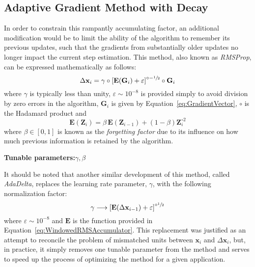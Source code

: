 \documentclass{article}
\begin{document}
\subsection{Adaptive Gradient Method with Decay}
\label{subsec:AdaDecay}

In order to constrain this rampantly accumulating factor, an additional modification would be to limit the ability of the algorithm to remember its previous updates, such that the gradients from substantially older updates no longer impact the current step estimation. This method, also known as \emph{RMSProp}, can be expressed mathematically as follows:
\begin{equation}
\label{eq:SE_RMSProp}
	\Delta \mathbf{x}_i = \gamma \circ \left[\mathbf{E}\!\left(\mathbf{G}_i\right) + \varepsilon\right]^{ \circ-\sfrac{1}{2}} \circ \mathbf{G}_i
\end{equation}
where $\gamma$ is typically less than unity, $\varepsilon \sim 10^{-8}$ is provided simply to avoid division by zero errors in the algorithm, $\mathbf{G}_i$ is given by Equation~\eqref{eq:GradientVector}, $\circ$ is the Hadamard product and
\begin{equation}
\label{eq:WindowedRMSAccumulator}
	\mathbf{E}\!\left(\mathbf{Z}_i\right) = \beta \, \mathbf{E}\!\left(\mathbf{Z}_{i-1}\right) + \left(1 - \beta\right) \mathbf{Z}_i^{\circ 2}
\end{equation}
where $\beta \in \left[0,1\right]$ is known as the \emph{forgetting factor} due to its influence on how much previous information is retained by the algorithm.

\begin{center}
	\textbf{Tunable parameters:}\hspace{20pt}$\gamma,\beta$
\end{center}

It should be noted that another similar development of this method, called \emph{AdaDelta}, replaces the learning rate parameter, $\gamma$, with the following normalization factor:
\begin{equation}
\label{eq:AdaDelta_RateReplacement}
	\gamma \longrightarrow \left[\mathbf{E}\!\left(\Delta \mathbf{x}_{i-1}\right) + \varepsilon\right]^{\circ\sfrac{1}{2}}
\end{equation}
where $\varepsilon \sim 10^{-8}$ and $\mathbf{E}$ is the function provided in Equation~\eqref{eq:WindowedRMSAccumulator}. This replacement was justified as an attempt to reconcile the problem of mismatched units between $\mathbf{x}_i$ and $\Delta\mathbf{x}_i$, but, in practice, it simply removes one tunable parameter from the method and serves to speed up the process of optimizing the method for a given application.
\end{document}
